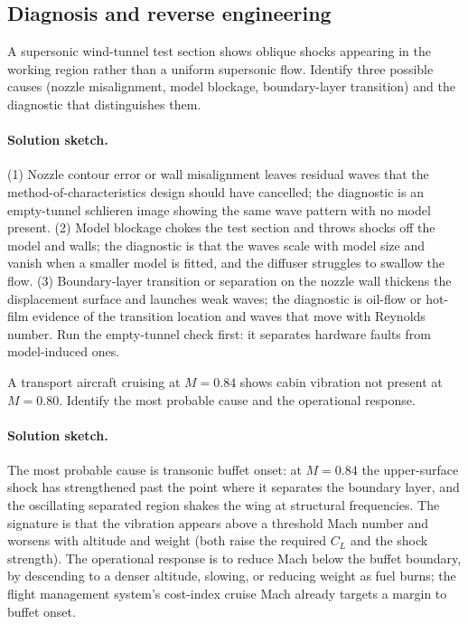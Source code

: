 \subsection*{Diagnosis and reverse engineering}

\begin{exercise}
A supersonic wind-tunnel test section shows oblique shocks
appearing in the working region rather than a uniform supersonic
flow. Identify three possible causes (nozzle misalignment, model
blockage, boundary-layer transition) and the diagnostic that
distinguishes them.
\paragraph{Solution sketch.} (1) Nozzle contour error or wall
misalignment leaves residual waves that the method-of-characteristics
design should have cancelled; the diagnostic is an empty-tunnel
schlieren image showing the same wave pattern with no model present.
(2) Model blockage chokes the test section and throws shocks off the
model and walls; the diagnostic is that the waves scale with model
size and vanish when a smaller model is fitted, and the diffuser
struggles to swallow the flow. (3) Boundary-layer transition or
separation on the nozzle wall thickens the displacement surface and
launches weak waves; the diagnostic is oil-flow or hot-film evidence of
the transition location and waves that move with Reynolds number. Run
the empty-tunnel check first: it separates hardware faults from
model-induced ones.
\end{exercise}

\begin{exercise}
A transport aircraft cruising at $M = 0.84$ shows cabin vibration
not present at $M = 0.80$. Identify the most probable cause and
the operational response.
\paragraph{Solution sketch.} The most probable cause is transonic
buffet onset: at $M = 0.84$ the upper-surface shock has strengthened
past the point where it separates the boundary layer, and the
oscillating separated region shakes the wing at structural
frequencies. The signature is that the vibration appears above a
threshold Mach number and worsens with altitude and weight (both raise
the required $C_L$ and the shock strength). The operational response is
to reduce Mach below the buffet boundary, by descending to a denser
altitude, slowing, or reducing weight as fuel burns; the flight
management system's cost-index cruise Mach already targets a margin to
buffet onset.
\end{exercise}

